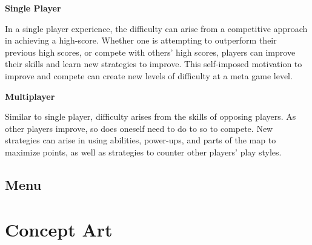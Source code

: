 \documentclass{article}
\theoremstyle{definition}
\begin{document}
\textbf{Single Player}

In a single player experience, the difficulty can arise
from a competitive approach in achieving a high-score. Whether one is
attempting to outperform their previous high scores, or compete with others'
high scores, players can improve their skills and learn new strategies to
improve. This self-imposed motivation to improve and compete can create new
levels of difficulty at a meta game level.

\textbf{Multiplayer}

Similar to single player, difficulty arises from the skills of opposing
players. As other players improve, so does oneself need to do to so to compete.
New strategies can arise in using abilities, power-ups, and parts of the map to
maximize points, as well as strategies to counter other players' play styles.

\subsection{Menu}

\section{Concept Art}
\end{document}
